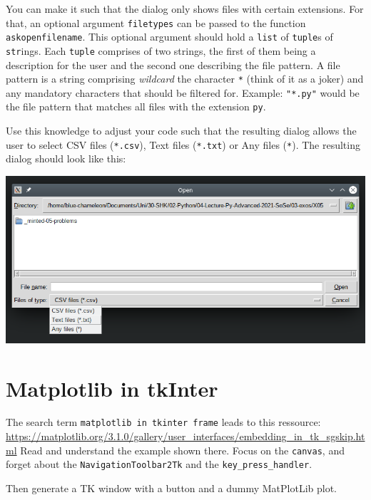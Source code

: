 \documentclass[
	english,
	fontsize=10pt,
	parskip=half,
	titlepage=true,
	DIV=12
]{scrartcl}
\newcommand*{\inPy}[1]{\texttt{#1}}
\begin{document}
You can make it such that the dialog only shows files with certain extensions. For that, an optional argument \texttt{filetypes} can be passed to the function \texttt{askopenfilename}. This optional argument should hold a \inPy{list} of \inPy{tuple}s of \inPy{str}ings. Each \inPy{tuple} comprises of two strings, the first of them being a description for the user and the second one describing the file pattern. A file pattern is a string comprising \emph{wildcard} the character \texttt{*} (think of it as a joker) and any mandatory characters that should be filtered for. Example: \inPy{"*.py"} would be the file pattern that matches all files with the extension \texttt{py}.

Use this knowledge to adjust your code such that the resulting dialog allows the user to select CSV files (\texttt{*.csv}), Text files (\texttt{*.txt}) or Any files (\texttt{*}). The resulting dialog should look like this:
\begin{center}
	\includegraphics[width=.6\linewidth]{./tk-filepicker}
\end{center}

\section{Matplotlib in tkInter}
The search term \texttt{matplotlib in tkinter frame} leads to this ressource: \url{https://matplotlib.org/3.1.0/gallery/user_interfaces/embedding_in_tk_sgskip.html}
Read and understand the example shown there. Focus on the \texttt{canvas}, and forget about the \texttt{NavigationToolbar2Tk} and the \texttt{key\_press\_handler}.

Then generate a TK window with a button and a dummy MatPlotLib plot.
\end{document}
